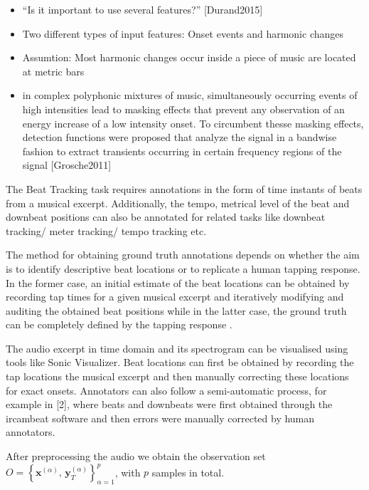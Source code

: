 \documentclass{scrartcl}
\begin{document}
\begin{itemize}
\item ``Is it important to use several features?'' [Durand2015]
\item Two different types of input features: Onset events and harmonic changes
\item Assumtion: Most harmonic changes occur inside a piece of music are located at metric bars \cite[Khadkevich2012]{Khadkevich2012}
\item in complex polyphonic mixtures of music, simultaneously occurring events of high intensities lead to masking effects that prevent any observation of an energy increase of a low intensity onset. To circumbent thesse masking effects, detection functions were proposed that analyze the signal in a bandwise fashion to extract transients occurring in certain frequency regions of the signal [Grosche2011]
\end{itemize}



The Beat Tracking task requires annotations in the form of time instants of beats from a musical excerpt. Additionally, the tempo, metrical level of the beat and downbeat positions can also be annotated for related tasks like downbeat tracking/ meter tracking/ tempo tracking etc.

The method for obtaining ground truth annotations depends on whether the aim is to identify descriptive beat locations or to replicate a human tapping response. In the former case, an initial estimate of the beat locations can be obtained by recording tap times for a given musical excerpt and iteratively modifying and auditing the obtained beat positions while in the latter case, the ground truth can be completely defined by the tapping response \cite{Davies2009b}.

The audio excerpt in time domain and its spectrogram can be visualised using tools like Sonic Visualizer. Beat locations can first be obtained by recording the tap locations the musical excerpt and then manually correcting these locations for exact onsets.  Annotators can also follow a semi-automatic process, for example in [2], where beats and downbeats were first obtained through the ircambeat software and then errors were manually corrected by human annotators.

After preprocessing the audio we obtain the observation set $ O = \left\{ \mathbf x^{(\alpha)}, \,\mathbf y_T^{(\alpha)} \right \}_{\alpha = 1}^p$, with $p$ samples in total. 
\end{document}
